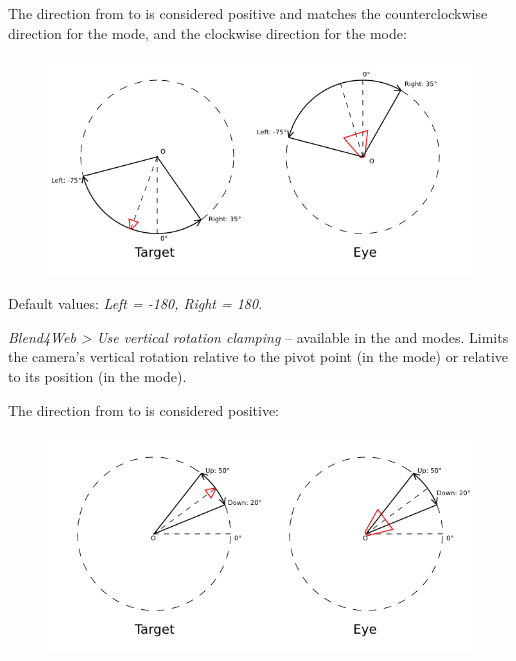 \documentclass[a4paper,12pt,oneside]{sphinxmanual}
\begin{document}
The direction from  to  is considered positive and matches the counterclockwise direction for the  mode, and the clockwise direction for the  mode:
\begin{figure}[htbp]
\centering

\includegraphics{horizontal_limits.png}
\end{figure}

Default values: \emph{Left = -180, Right = 180}.

\begin{DUlineblock}{0em}
\item[] 
\end{DUlineblock}

\emph{Blend4Web \textgreater{} Use vertical rotation clamping} -- available in the  and  modes. Limits the camera's vertical rotation relative to the pivot point (in the  mode) or relative to its position (in the  mode).

The direction from  to  is considered positive:
\begin{figure}[htbp]
\centering

\includegraphics{vertical_limits.png}
\end{figure}
\end{document}
